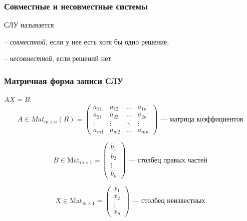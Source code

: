 \subsubsection{Совместные и несовместные системы}
\begin{definition}
    СЛУ называется

    -- \textit{совместной}, если у нее есть хотя бы одно решение,

    -- \textit{несовместной}, если решений нет.
\end{definition}

\subsubsection{Матричная форма записи СЛУ}

$AX = B$.
\begin{equation*}
    A \in Mat_{m \times n}(R) = \begin{pmatrix}
        a_{11} & a_{12} & \dots & a_{1n} \\
        a_{21} & a_{22} & \dots & a_{2n} \\
        \vdots & \vdots & \ddots & \vdots \\
        a_{m1} & a_{m2} & \dots & a_{mn}
    \end{pmatrix} \text{ --- матрица коэффициентов}
\end{equation*}

\begin{equation*}
    B \in \text{Mat}_{m \times 1} = \begin{pmatrix}
        b_1 \\ b_2 \\ \vdots \\ b_n
    \end{pmatrix} \text{ --- столбец правых частей}
\end{equation*}

\begin{equation*}
    X \in \text{Mat}_{m \times 1} = \begin{pmatrix}
        x_1 \\ x_2 \\ \vdots \\ x_n
    \end{pmatrix} \text{ --- столбец неизвестных}
\end{equation*}
